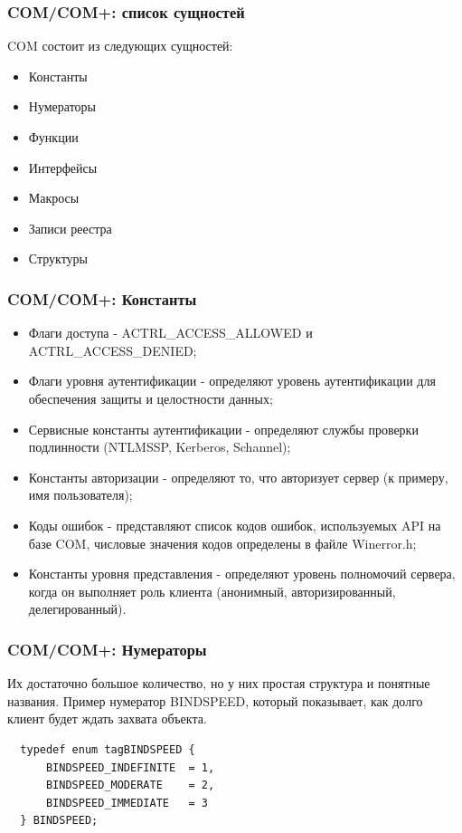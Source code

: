 \documentclass{beamer}
\begin{document}

\begin{frame}
\frametitle{COM/COM+: список сущностей}

COM состоит из следующих сущностей:
\begin{itemize}
\item Константы
\item Нумераторы
\item Функции
\item Интерфейсы
\item Макросы
\item Записи реестра
\item Структуры
\end{itemize}

\end{frame}


\begin{frame}
\frametitle{COM/COM+: Константы}

\begin{itemize}
\item {Флаги доступа - ACTRL\_ACCESS\_ALLOWED и ACTRL\_ACCESS\_DENIED;}
\item {Флаги уровня аутентификации - определяют уровень аутентификации для обеспечения защиты и целостности данных;}
\item {Сервисные константы аутентификации - определяют службы проверки подлинности (NTLMSSP, Kerberos, Schannel);}
\item {Константы авторизации - определяют то, что авторизует сервер (к примеру, имя пользователя);}
\item {Коды ошибок - представляют список кодов ошибок, используемых API на базе COM, числовые значения кодов определены в файле Winerror.h;}
\item {Константы уровня представления - определяют уровень полномочий сервера, когда он выполняет роль клиента (анонимный, авторизированный, делегированный).}
\end{itemize}

\end{frame}


\begin{frame}[fragile]
\frametitle{COM/COM+: Нумераторы}


Их достаточно большое количество, но у них простая структура и понятные названия. Пример нумератор BINDSPEED, который показывает, как долго клиент будет ждать захвата объекта.

\begin{verbatim}
  typedef enum tagBINDSPEED { 
      BINDSPEED_INDEFINITE  = 1,
      BINDSPEED_MODERATE    = 2,
      BINDSPEED_IMMEDIATE   = 3
  } BINDSPEED;
\end{verbatim}

\end{frame}
\end{document}
